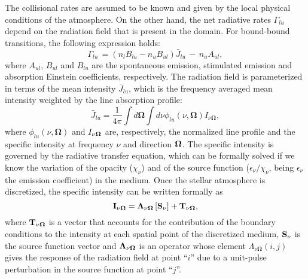 \documentclass[12pt]{article}
\begin{document}
The collisional rates are assumed to be known and given by the local physical
conditions of the atmosphere. On the other
hand, the net radiative rates $\Gamma_{lu}$ depend on the radiation field that is
present in the domain. For bound-bound transitions, the following expression
holds:
\begin{equation}
\label{eq:net_rate_bound}
\Gamma_{lu}\,=(n_lB_{lu}-n_uB_{ul}){\bar{J}}_{lu}\,-\,n_uA_{ul},
\end{equation}
where $A_{ul}$, $B_{ul}$ and $B_{lu}$ are the spontaneous emission, stimulated emission and
absorption Einstein coefficients, respectively. The radiation field is parameterized
in terms of the mean intensity $\bar J_{lu}$, which
is the frequency averaged mean intensity weighted by the line absorption profile:
\begin{equation}
\label{eq:mean_intensity}
\bar J_{lu} = \frac{1}{4 \pi} \int d \mathbf{\Omega} \int d \nu \phi_{lu} (\nu,
\mathbf{\Omega})
I_{\nu \mathbf{\Omega}},
\end{equation}
where $\phi_{lu}(\nu,\mathbf{\Omega})$ and $I_{\nu \bf \Omega}$ are, respectively, the normalized line
profile and
the specific intensity at frequency $\nu$ and direction $\bf \Omega \rm$. The
specific intensity is governed by the radiative
transfer equation, which can be formally solved if we know the variation of the
opacity ($\chi_{\nu}$) and of the source function ($\epsilon_{\nu}/\chi_{\nu}$, being
$\epsilon_{\nu}$ the emission coefficient)
in the medium. Once the stellar atmosphere is discretized, the specific intensity
can be written formally as
\begin{equation}
\label{eq:formal_sol}
\bf I_{\nu \mathbf{\Omega}} = \bf \Lambda_{\nu \mathbf{\Omega}} \left[ \bf S_{\nu}
\right] + \mathcal{\bf T}_{\nu \mathbf{\Omega}}, \nonumber
\end{equation}
where $\mathcal{\bf T}_{\nu \mathbf{\Omega}}$ is a vector that accounts for the
contribution of the boundary conditions to the intensity
at each spatial point of the discretized medium, $\bf S_{\nu}$ is the source
function vector
and $\bf \Lambda_{\nu \mathbf{\Omega}}$ is an operator whose element
$\Lambda_{\nu\mathbf{\Omega}}(i,j)$ gives the response of the radiation field at
point ``$i$'' due to a unit-pulse perturbation in the source function at point ``$j$''.
\end{document}
